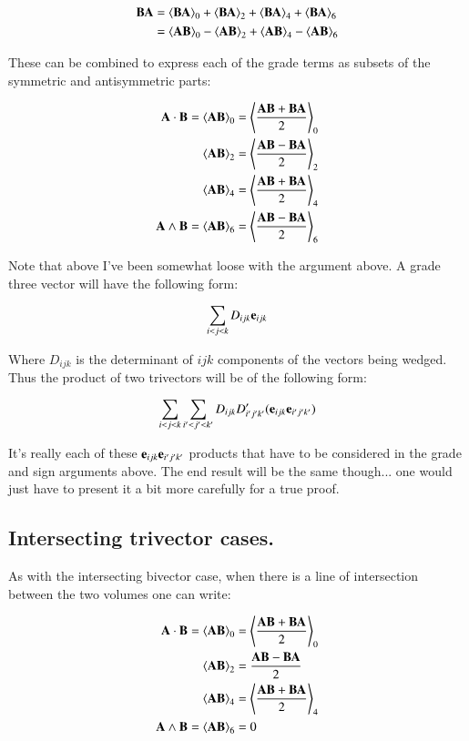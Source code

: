 \documentclass{article}      %
\newcommand{\gpgrade}[2] {{\left\langle{{#1}}\right\rangle}_{#2}}
\begin{document}
\begin{align*}
\BB\BA
&=\gpgrade{\BB\BA}{0}
+\gpgrade{\BB\BA}{2}
+\gpgrade{\BB\BA}{4}
+\gpgrade{\BB\BA}{6} \\
&=\gpgrade{\BA\BB}{0}
-\gpgrade{\BA\BB}{2}
+\gpgrade{\BA\BB}{4}
-\gpgrade{\BA\BB}{6} \\
\end{align*}

These can be combined to express each of the grade terms as subsets
of the symmetric and antisymmetric parts:

\begin{align*}
\BA \cdot \BB = \gpgrade{\BA\BB}{0} &= \gpgrade{\frac{\BA\BB + \BB\BA}{2}}{0} \\
\gpgrade{\BA\BB}{2} &= \gpgrade{\frac{\BA\BB - \BB\BA}{2}}{2} \\
\gpgrade{\BA\BB}{4} &= \gpgrade{\frac{\BA\BB + \BB\BA}{2}}{4} \\
\BA \wedge \BB = \gpgrade{\BA\BB}{6} &= \gpgrade{\frac{\BA\BB - \BB\BA}{2}}{6} \\
\end{align*}

Note that above I've been somewhat loose with the argument above.  A grade three vector
will have the following form:

\[
\sum_{i<j<k} D_{ijk} \mathbf{e}_{ijk}
\]

Where $D_{ijk}$ is the determinant of $ijk$ components of the vectors being wedged.  Thus the product
of two trivectors will be of the following form:

\[
\sum_{i<j<k} \sum_{i'<j'<k'} D_{ijk} D'_{i'j'k'} (\mathbf{e}_{ijk} \mathbf{e}_{i'j'k'})
\]

It's really each of these $\mathbf{e}_{ijk} \mathbf{e}_{i'j'k'}$ products that have to be considered in the grade 
and sign arguments above.  The end result will be the same though... one would just have to present
it a bit more carefully for a true proof.

\subsection{ Intersecting trivector cases. }

As with the intersecting bivector case, when there is a line of intersection between the two volumes one can
write:

\begin{align*}
\BA \cdot \BB = \gpgrade{\BA\BB}{0} &= \gpgrade{\frac{\BA\BB + \BB\BA}{2}}{0} \\
\gpgrade{\BA\BB}{2} &= \frac{\BA\BB - \BB\BA}{2} \\
\gpgrade{\BA\BB}{4} &= \gpgrade{\frac{\BA\BB + \BB\BA}{2}}{4} \\
\BA \wedge \BB = \gpgrade{\BA\BB}{6} &= 0 \\
\end{align*}
\end{document}
